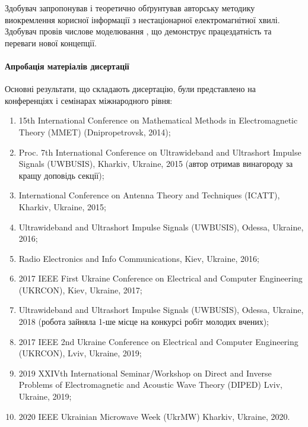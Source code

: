 Здобувач запропонував \cite{my:UWBUSIS2018} і теоретично обґрунтував
\cite{my:UKRCON2020} авторську методику виокремлення корисної інформації 
з нестаціонарної електромагнітної хвилі. Здобувач провів числове 
моделювання \cite{my:TKEA2020}, що демонструє працездатність 
та переваги нової концепції.

\paragraph{Апробація матеріалів дисертації}

Основні результати, що складають дисертацію, були представлено 
на конференціях і семінарах міжнародного рівня:

\begin{enumerate}

	\item 15th International Conference on Mathematical Methods in 
	Electromagnetic Theory (MMET) (Dnipropetrovsk, 2014);

	\item Proc. 7th International Conference on Ultrawideband and 
	Ultrashort Impulse Signals (UWBUSIS), Kharkiv, Ukraine, 2015 (автор отримав 
	винагороду за кращу доповідь секції);

	\item International Conference on Antenna Theory and Techniques
	(ICATT), Kharkiv, Ukraine, 2015;

	\item Ultrawideband and Ultrashort Impulse Signals 
	(UWBUSIS), Odessa, Ukraine, 2016;

	\item Radio Electronics and Info Communications, Kiev, Ukraine, 2016;

	\item 2017 IEEE First Ukraine Conference on Electrical and Computer 
	Engineering (UKRCON), Kiev, Ukraine, 2017;

	\item Ultrawideband and Ultrashort Impulse Signals (UWBUSIS), 
	Odessa, Ukraine, 2018 (робота зайняла 1-ше місце на конкурсі 
	робіт молодих вчених);

	\item 2017 IEEE 2nd Ukraine Conference on Electrical and Computer 
	Engineering (UKRCON), Lviv, Ukraine, 2019;

	\item 2019 XXIVth International Seminar/Workshop on Direct and Inverse
	Problems of Electromagnetic and Acoustic Wave Theory (DIPED) Lviv, 
	Ukraine, 2019;
	
	\item 2020 IEEE Ukrainian Microwave Week (UkrMW) Kharkiv, Ukraine, 2020.
	
\end{enumerate} 

